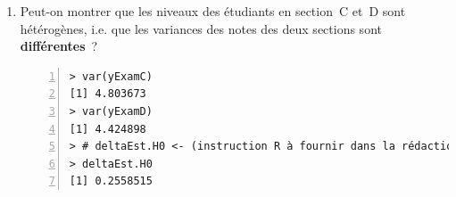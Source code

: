 \documentclass[10pt]{report}
\begin{document}
\begin{exercice}
\begin{enumerate}
\begin{Correction}
\noindent \textbf{Préliminaire} : puisque $\mathtt{(mean(yExamC)-mean(yExamD)-1)}\simeq1.12$ est du même signe (i.e. positif) que $\mathtt{deltaEst.H0}$ , on a~: 
      \begin{itemize}
\item \textit{paramètre d'intérêt}~: $d_\mu=\mu^{EC}-\mu^{ED}$
\item \textit{sa future estimation}~: $\Est{d_\mu}{Y^{EC},Y^{ED}}=\Est{\mu^{EC}}{Y^{EC}}-\Est{\mu^{ED}}{Y^{ED}}$
\end{itemize}
\noindent \textbf{Hypothèses de test} : $\mathbf{H}_0:$ $d_\mu=1$ vs {\large $\mathbf{H}_1:$ $d_\mu>1$}\\
\textbf{Statistique de test sous $\mathbf{H}_0$} :
  $$
  \Est{\delta_{d_\mu,1}}{Y^{EC},Y^{ED}}= {\displaystyle \frac{\Est{d_\mu}{Y^{EC},Y^{ED}}-1}{
\Est{\sigma_{\cqlshat{d_\mu}}}{Y^{EC},Y^{ED}}
}} 
  \SuitApprox \mathcal{N}(0,1)
  $$
\textbf{Règle de décision} : Accepter $\mathbf{H}_1$ si 
  $\Est{\delta_{d_\mu,1}}{y^{EC},y^{ED}} > \delta^+_{lim,5\%}$\\
\noindent \textbf{Conclusion} :
puisqu'au vu des données, 
  \begin{eqnarray*}
\Est{\delta_{d_\mu,1}}{y^{EC},y^{ED}} &\NotR&\mathtt{(mean(yExamC)-mean(yExamD)-1)/seDMean(yExamC,yExamD)}\simeq 2.606969\\& >  & \delta^+_{lim,5\%} \NotR \mathtt{qnorm(1-.05)}\simeq1.644854
\end{eqnarray*}
  
on peut plutôt penser (avec un risque de 5\%) que la note moyenne de la section~C est de plus d'un point supérieure à la note moyenne de la section~D.
\end{Correction}


\item Peut-on montrer que les niveaux des {\'e}tudiants en section~C et~D sont h{\'e}t{\'e}rog{\`e}nes, i.e. que les variances des notes des deux sections sont \textbf{diff{\'e}rentes}~?

\IndicR
\begin{Verbatim}[frame=leftline,fontfamily=tt,fontshape=n,numbers=left]
> var(yExamC)
[1] 4.803673
> var(yExamD)
[1] 4.424898
> # deltaEst.H0 <- (instruction R à fournir dans la rédaction)
> deltaEst.H0
[1] 0.2558515
\end{Verbatim}

 


\end{enumerate}
\end{exercice}
\end{document}
